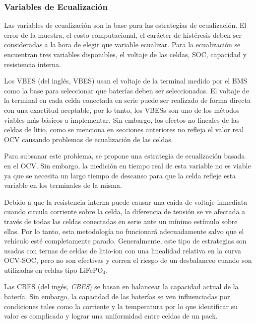 \documentclass[10pt,a4paper]{article}
\newcounter{subsubsubsection}[subsubsection]
\begin{document}
\subsubsection{Variables de Ecualizaci\'on}

Las variables de ecualizaci\'on son la base para las estrategias de
ecualizaci\'on. El error de la muestra, el costo computacional, el car\'acter de
hist\'eresis deben ser consideradas a la hora de elegir que variable ecualizar.
Para la ecualizaci\'on se encuentran tres variables disponibles, el voltaje de 
las celdas, \acrshort{SOC}, capacidad y resistencia interna.


Los \acrshort{VBES} (del ingl\'es, \acrlong{VBES}) usan el voltaje de la
terminal medido por el \acrshort{BMS} como la base para seleccionar que
bater\'ias deben ser seleccionadas. El voltaje de la terminal en cada celda
conectada en serie puede ser realizado de forma directa con una exactitud
aceptable, por lo tanto, los \acrshort{VBES}s son uno de los m\'etodos viables
m\'as b\'asicos a implementar. Sin embargo, los efectos no lineales de las
celdas de litio, como se menciona en secciones anteriores no refleja el valor
real \acrshort{OCV} causando problemas de ecualizaci\'on de las celdas.

Para subsanar este problema, se propone una estrategia de ecualizaci\'on basada
en el \acrshort{OCV}. Sin embargo, la medici\'on en tiempo real de esta variable
no es viable ya que se necesita un largo tiempo de descanso para que la celda
refleje esta variable en los terminales de la misma.

Debido a que la resistencia interna puede causar una ca\'ida de voltaje
inmediata cuando circula corriente sobre la celda, la diferencia de tensi\'on se
ve afectada a trav\'es de todas las celdas conectadas en serie ante un m\'inimo
est\'imulo sobre ellas. Por lo tanto, esta metodolog\'ia no funcionar\'a
adecuadamente salvo que el veh\'iculo est\'e completamente parado.
Generalmente, este tipo de estrategias son usadas con ternas de celdas de
litio-ion con una linealidad relativa en la curva \acrshort{OCV}-\acrshort{SOC},
pero no son efectivas y corren el riesgo de un desbalanceo cuando son utilizadas
en celdas tipo LiFeP$\mathrm{O_4}$. 


Las \acrshort{CBES} (del ing\'es, \emph{\acrlong{CBES}}) se basan en balancear
la capacidad actual de la bater\'ia. Sin embargo, la capacidad de las bater\'ias
se ven influenciadas por condiciones tales como la corriente y la temperatura
por lo que identificar su valor es complicado y lograr una uniformidad entre
celdas de un pack.
\end{document}
